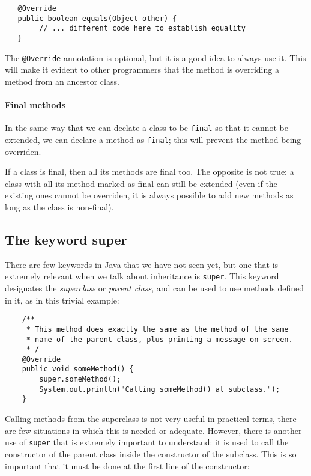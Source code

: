 \begin{verbatim}
   @Override
   public boolean equals(Object other) {
        // ... different code here to establish equality
   }
\end{verbatim}

The \verb+@Override+ annotation is optional, but it is a good idea to
always use it. This will make it evident to other programmers 
that the method is overriding a
method from an ancestor class. 

\paragraph{Final methods}
\label{sec:final-methods}

In the same way that we can declate a class to be \verb+final+ so that
it cannot be extended, we can declare a method as \verb+final+; this
will prevent the method being overriden. 

If a class is final, then all its methods are final too. 
The opposite is not true: a class with all its method
marked as final can still be extended (even if the existing ones
cannot be overriden, it is always possible to add new methods as long
as the class is non-final).

\subsection{The keyword super}
\label{sec:keyword-super}

There are few keywords in Java that we have not seen yet, but one that
is extremely relevant when we talk about inheritance is
\verb+super+. This keyword designates the \emph{superclass} or
\emph{parent class}, and can be used to use methods defined in it, as
in this trivial example: 

\begin{verbatim}
    /**
     * This method does exactly the same as the method of the same
     * name of the parent class, plus printing a message on screen. 
     * /
    @Override
    public void someMethod() {
        super.someMethod();
        System.out.println("Calling someMethod() at subclass.");
    }
\end{verbatim}

Calling methods from the superclass is not very useful in practical
terms, there are few situations in which this is needed or
adequate. However, there is another use of \verb+super+ that is extremely important to
understand: it is used to call the constructor of the parent class
inside the constructor of the subclass. This is so important that it must be
done at the first line of the constructor: 

